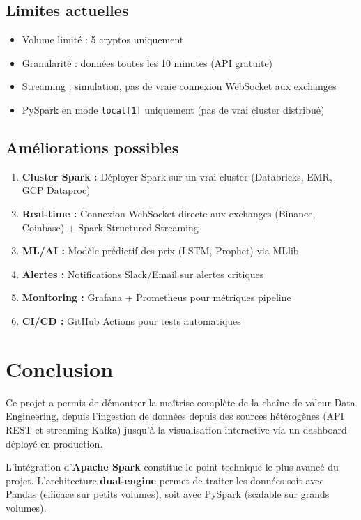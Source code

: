 \documentclass[12pt,a4paper]{article}
\begin{document}
\subsection{Limites actuelles}
\begin{itemize}
    \item Volume limité : 5 cryptos uniquement
    \item Granularité : données toutes les 10 minutes (API gratuite)
    \item Streaming : simulation, pas de vraie connexion WebSocket aux exchanges
    \item PySpark en mode \texttt{local[1]} uniquement (pas de vrai cluster distribué)
\end{itemize}

\subsection{Améliorations possibles}
\begin{enumerate}
    \item \textbf{Cluster Spark :} Déployer Spark sur un vrai cluster (Databricks, EMR, GCP Dataproc)
    \item \textbf{Real-time :} Connexion WebSocket directe aux exchanges (Binance, Coinbase) + Spark Structured Streaming
    \item \textbf{ML/AI :} Modèle prédictif des prix (LSTM, Prophet) via MLlib
    \item \textbf{Alertes :} Notifications Slack/Email sur alertes critiques
    \item \textbf{Monitoring :} Grafana + Prometheus pour métriques pipeline
    \item \textbf{CI/CD :} GitHub Actions pour tests automatiques
\end{enumerate}

\section{Conclusion}

Ce projet a permis de démontrer la maîtrise complète de la chaîne de valeur Data Engineering, depuis l'ingestion de données depuis des sources hétérogènes (API REST et streaming Kafka) jusqu'à la visualisation interactive via un dashboard déployé en production.

L'intégration d'\textbf{Apache Spark} constitue le point technique le plus avancé du projet. L'architecture \textbf{dual-engine} permet de traiter les données soit avec Pandas (efficace sur petits volumes), soit avec PySpark (scalable sur grands volumes).
\end{document}
